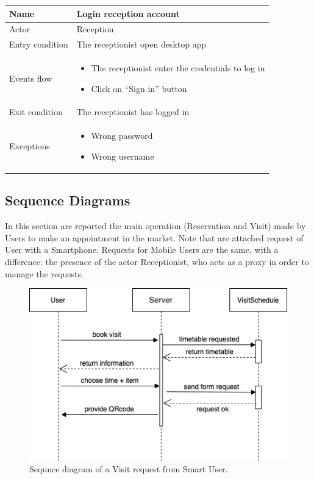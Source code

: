 \begin{tabular}{|p{5cm} | p{7cm} | }
	\hline
	Name & Login reception account \\
	\hline
	Actor & Reception \\
	\hline
	Entry condition &
	The receptionist open desktop app  \\
	\hline
	Events flow & 
	\begin{itemize}
		\item The receptionist enter the credentials to log in 
		\item Click on “Sign in” button
	\end{itemize} \\
	\hline
	Exit condition &
	The receptionist has logged in \\
	\hline 
	Exceptions & 
	\begin{itemize}
		\item Wrong password
		\item Wrong username
	\end{itemize} \\
	\hline
\end{tabular}

\subsection{Sequence Diagrams}
In this section are reported the main operation (Reservation and Visit) made by  Users to make an appointment in the market. Note that are attached request of User with a Smartphone. Requests for Mobile Users are the same, with a difference: the presence of the actor Receptionist, who acts as a proxy in order to manage the requests.


\begin{figure}[H]
  \caption{Sequnce diagram of a Visit request from Smart User.}
  \label{fig:SD_visit}
  \centering
  \includegraphics[scale=0.45]{diagrams/SD_visit.png}

\end{figure}



